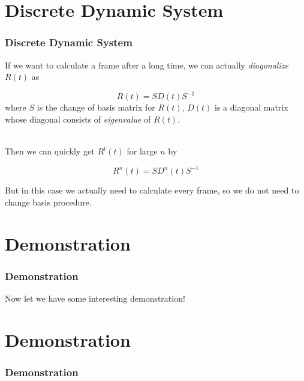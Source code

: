 \documentclass[12pt, t]{beamer}
\renewcommand{\emph}[1]{{\color{Turquoise3}\textsl{#1}}}
\newcommand{\nullspace}{~\\[15pt]}
\begin{document}

\section{Discrete Dynamic System}
\begin{frame}
    \frametitle{Discrete Dynamic System}

    If we want to calculate a frame after a long time, we can actually \emph{diagonalize} $R(t)$
    as

    \begin{equation*}
        R(t) = S D(t) S^{-1}
    \end{equation*}
    where $S$ is the change of basis matrix for $R(t)$, $D(t)$ is a diagonal matrix whose diagonal 
    consists of \emph{eigenvalue} of $R(t)$.

    \nullspace
    Then we can quickly get $R^t(t)$ for large $n$ by
    
    \begin{equation*}
        R^n(t) = SD^n(t)S^{-1}
    \end{equation*}
    
    But in this case we actually need to calculate every frame, 
    so we do not need to change basis procedure.

\end{frame}


\section{Demonstration}
\begin{frame}
    \frametitle{Demonstration}

    Now let we have some interesting demonstration!


\end{frame}


\section{Demonstration}
\begin{frame}
    \frametitle{Demonstration}



\end{frame}
\end{document}
